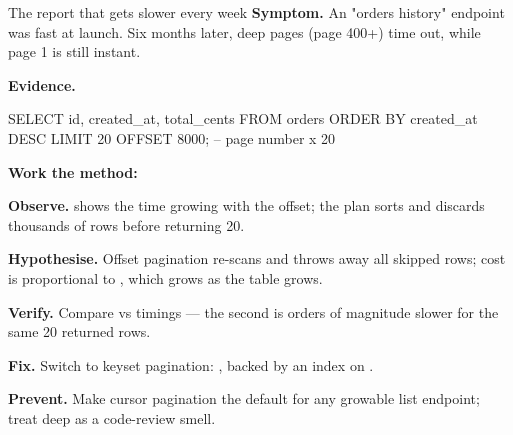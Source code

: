 \begin{debuglab}{The report that gets slower every week}
\textbf{Symptom.} An "orders history" endpoint was fast at launch. Six months later, deep pages (page 400+) time out, while page 1 is still instant.

\smallskip\textbf{Evidence.}
\begin{sqlbox}
SELECT id, created_at, total_cents FROM orders
ORDER BY created_at DESC
LIMIT 20 OFFSET 8000;   -- page number x 20
\end{sqlbox}

\textbf{Work the method:}
\begin{tickcheck}
  \item \textbf{Observe.}  shows the time growing with the offset; the plan sorts and discards thousands of rows before returning 20.
  \item \textbf{Hypothesise.} Offset pagination re-scans and throws away all skipped rows; cost is proportional to , which grows as the table grows.
  \item \textbf{Verify.} Compare  vs  timings --- the second is orders of magnitude slower for the same 20 returned rows.
  \item \textbf{Fix.} Switch to keyset pagination: , backed by an index on .
  \item \textbf{Prevent.} Make cursor pagination the default for any growable list endpoint; treat deep  as a code-review smell.
\end{tickcheck}
\end{debuglab}

